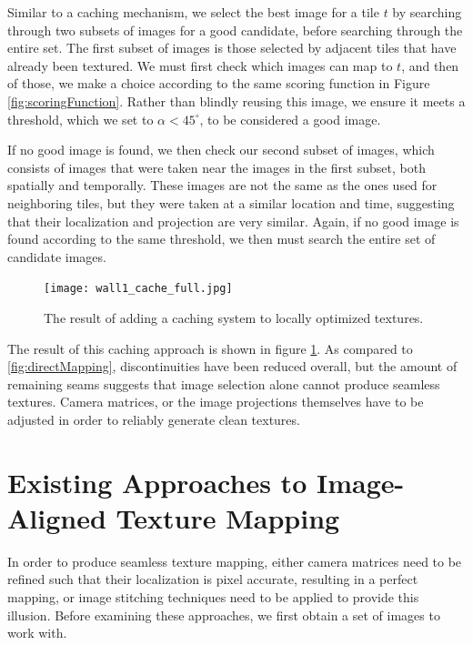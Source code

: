 \documentclass[10pt,twocolumn,letterpaper]{article}
\begin{document}
Similar to a caching mechanism, we select the best image for a tile
$t$ by searching through two subsets of images for a good candidate,
before searching through the entire set. The first subset of images is
those selected by adjacent tiles that have already been textured. We
must first check which images can map to $t$, and then of those, we
make a choice according to the same scoring function in Figure
\ref{fig:scoringFunction}. Rather than blindly reusing this image, we
ensure it meets a threshold, which we set to $\alpha < 45^\circ$, to
be considered a good image.

If no good image is found, we then check our second subset of images,
which consists of images that were taken near the images in the first
subset, both spatially and temporally. These images are not the same
as the ones used for neighboring tiles, but they were taken at a
similar location and time, suggesting that their localization and
projection are very similar. Again, if no good image is found
according to the same threshold, we then must search the entire set of
candidate images.

\begin{figure}
  \centering
  \texttt{[image: wall1\_cache\_full.jpg]}
  \caption{The result of adding a caching system to locally optimized
    textures.}
  \label{fig:caching}
\end{figure}


The result of this caching approach is shown in figure
\ref{fig:caching}. As compared to \ref{fig:directMapping},
discontinuities have been reduced overall, but the amount of remaining
seams suggests that image selection alone cannot produce seamless
textures. Camera matrices, or the image projections themselves have to
be adjusted in order to reliably generate clean textures.

\section{Existing Approaches to Image-Aligned Texture Mapping}
\label{sec:existingApproaches}
In order to produce seamless texture mapping, either camera matrices
need to be refined such that their localization is pixel accurate,
resulting in a perfect mapping, or image stitching techniques need to
be applied to provide this illusion. Before examining these
approaches, we first obtain a set of images to work with.
\end{document}
